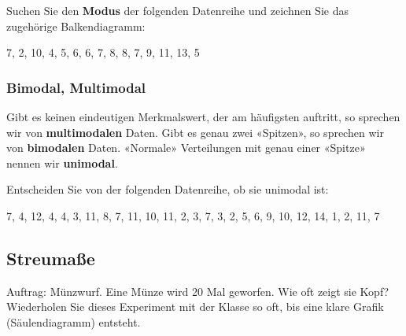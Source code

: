 Suchen Sie den \textbf{Modus} der folgenden Datenreihe und zeichnen Sie das
zugehörige Balkendiagramm:

7, 2, 10,  4, 5, 6, 6, 7, 8, 8, 7, 9, 11, 13, 5




\subsubsection{Bimodal, Multimodal}
Gibt es keinen eindeutigen Merkmalswert, der am häufigsten auftritt,
so sprechen wir von \textbf{multimodalen} Daten. Gibt es
genau zwei «Spitzen», so sprechen wir von \textbf{bimodalen}
Daten. «Normale» Verteilungen mit genau einer «Spitze» nennen wir \textbf{unimodal}.


Entscheiden Sie von der folgenden Datenreihe, ob sie unimodal ist:

7, 4, 12, 4, 4, 3,  11, 8, 7, 11, 10, 11, 2, 3, 7, 3, 2, 5, 6, 9, 10, 12, 14, 1, 2, 11, 7






\subsection{Streumaße}
Auftrag: Münzwurf. Eine Münze wird 20 Mal geworfen. Wie oft zeigt sie Kopf? Wiederholen Sie dieses Experiment mit der Klasse so oft, bis eine klare Grafik (Säulendiagramm) entsteht.


